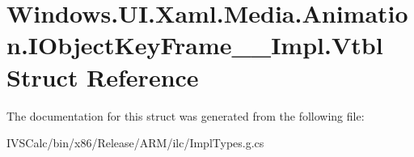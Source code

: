 \hypertarget{struct_windows_1_1_u_i_1_1_xaml_1_1_media_1_1_animation_1_1_i_object_key_frame_____impl_1_1_vtbl}{}\section{Windows.\+U\+I.\+Xaml.\+Media.\+Animation.\+I\+Object\+Key\+Frame\+\_\+\+\_\+\+Impl.\+Vtbl Struct Reference}
\label{struct_windows_1_1_u_i_1_1_xaml_1_1_media_1_1_animation_1_1_i_object_key_frame_____impl_1_1_vtbl}


The documentation for this struct was generated from the following file\+:\begin{DoxyCompactItemize}
\item 
I\+V\+S\+Calc/bin/x86/\+Release/\+A\+R\+M/ilc/Impl\+Types.\+g.\+cs\end{DoxyCompactItemize}
